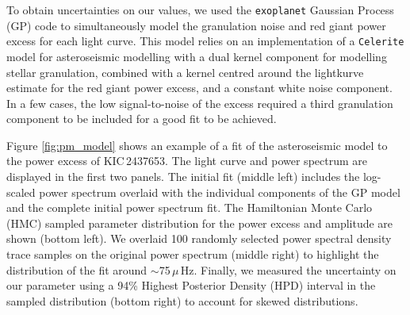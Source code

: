 To obtain uncertainties on our \numax{} values, we used the \texttt{exoplanet} Gaussian Process (GP) code \citep{foreman-mackey_fast_2017} to simultaneously model the granulation noise and red giant power excess for each light curve. This model relies on an implementation of a \texttt{Celerite} model for asteroseismic modelling with a dual kernel component for modelling stellar granulation, combined with a kernel centred around the lightkurve \numax{} estimate for the red giant power excess, and a constant white noise component. In a few cases, the low signal-to-noise of the excess required a third granulation component to be included for a good fit to be achieved. 

Figure \ref{fig:pm_model} shows an example of a fit of the asteroseismic model to the power excess of KIC\,2437653. The light curve and power spectrum are displayed in the first two panels. The initial fit (middle left) includes the log-scaled power spectrum overlaid with the individual components of the GP model and the complete initial power spectrum fit. The Hamiltonian Monte Carlo (HMC) sampled parameter distribution for the power excess and amplitude are shown (bottom left). We overlaid 100 randomly selected power spectral density trace samples on the original power spectrum (middle right) to highlight the distribution of the fit around \numax{}$\sim$75\,$\mu$\,Hz. Finally, we measured the uncertainty on our \numax{} parameter using a 94\% Highest Posterior Density (HPD) interval in the sampled distribution (bottom right) to account for skewed distributions.

